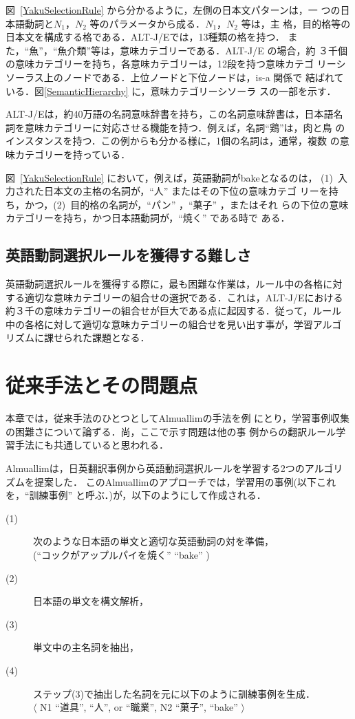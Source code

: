 図~\ref{YakuSelectionRule} から分かるように，左側の日本文パターンは，一
つの日本語動詞と$N_1，N_2$ 等のパラメータから成る．$N_1，N_2$ 等は，主
格，目的格等の日本文を構成する格である．ALT-J/Eでは，13種類の格を持つ．
また，``魚''，``魚介類''等は，意味カテゴリーである．ALT-J/E の場合，約
３千個の意味カテゴリーを持ち，各意味カテゴリーは，12段を持つ意味カテゴ
リーシソーラス上のノードである．上位ノードと下位ノードは，is-a 関係で
結ばれている．図\ref{SemanticHierarchy} に，意味カテゴリーシソーラ
スの一部を示す．

ALT-J/Eは，約40万語の名詞意味辞書を持ち，この名詞意味辞書は，日本語名
詞を意味カテゴリーに対応させる機能を持つ．例えば，名詞``鶏''は，肉と鳥
のインスタンスを持つ．この例からも分かる様に，1個の名詞は，通常，複数
の意味カテゴリーを持っている．

図~\ref{YakuSelectionRule} において，例えば，英語動詞がbakeとなるのは，
(1)~入力された日本文の主格の名詞が，``人'' またはその下位の意味カテゴ
リーを持ち，かつ，(2)~目的格の名詞が，``パン'' ，``菓子'' ，またはそれ
らの下位の意味カテゴリーを持ち，かつ日本語動詞が，``焼く'' である時で
ある．

\subsection{英語動詞選択ルールを獲得する難しさ}
英語動詞選択ルールを獲得する際に，最も困難な作業は，ルール中の各格に対
する適切な意味カテゴリーの組合せの選択である．これは，ALT-J/Eにおける
約３千の意味カテゴリーの組合せが巨大である点に起因する．従って，ルール
中の各格に対して適切な意味カテゴリーの組合せを見い出す事が，学習アルゴ
リズムに課せられた課題となる．

\section{従来手法とその問題点\label{TheFormerWork}}
本章では，従来手法のひとつとしてAlmuallimの手法\cite{Almuallim94c}を例
にとり，学習事例収集の困難さについて論ずる．尚，ここで示す問題は他の事
例からの翻訳ルール学習手法にも共通していると思われる．

Almuallimは，日英翻訳事例から英語動詞選択ルールを学習する2つのアルゴリ
ズム\cite{Almuallim94c}を提案した．
このAlmuallimのアプローチでは，学習用の事例(以下これを，``訓練事例''
と呼ぶ．)が，以下のようにして作成される．
\begin{description}
\item[(1)] 次のような日本語の単文と適切な英語動詞の対を準備，\\
(``コックがアップルパイを焼く'' ``bake'' )
\item[(2)] 日本語の単文を構文解析，
\item[(3)] 単文中の主名詞を抽出，
\item[(4)] ステップ(3)で抽出した名詞を元に以下のように訓練事例を生成．\\
$\langle$ N1 \myinm ``道具'', ``人'', or ``職業'', N2 \myinm ``菓子'',
``bake'' $\rangle$\\
\end{description}

